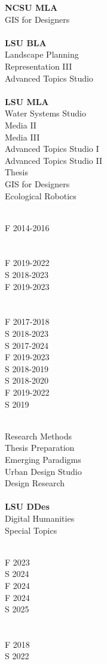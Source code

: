 \documentclass[10pt]{designcv}
\begin{document}
\begin{minipage}[t]{0.3\textwidth} 
\textbf{NCSU MLA}\\
GIS for Designers\\
\ \\
\textbf{LSU BLA}\\
Landscape Planning\\
Representation III\\
Advanced Topics Studio\\
\ \\
\textbf{LSU MLA}\\
Water Systems Studio\\
Media II\\
Media III\\
Advanced Topics Studio I\\
Advanced Topics Studio II\\
Thesis\\
GIS for Designers\\
Ecological Robotics\\
\end{minipage}
\begin{minipage}[t]{0.2\textwidth} 
\ \\
F 2014-2016\\
\ \\
\ \\
F 2019-2022\\
S 2018-2023\\
F 2019-2023\\
\ \\
\ \\
F 2017-2018\\
S 2018-2023\\
S 2017-2024\\
F 2019-2023\\
S 2018-2019\\
S 2018-2020\\
F 2019-2022\\
S 2019\\
\end{minipage}
\begin{minipage}[t]{0.3\textwidth}
\ \\
Research Methods\\
Thesis Preparation\\
Emerging Paradigms\\
Urban Design Studio\\
Design Research\\
\ \\
\textbf{LSU DDes}\\
Digital Humanities\\
Special Topics\\
\end{minipage}
\hfill
\begin{minipage}[t]{0.2\textwidth}
\ \\
F 2023\\
S 2024\\
F 2024\\
F 2024\\
S 2025\\
\ \\
\ \\
F 2018\\
S 2022\\
\end{minipage}
\hfill
\end{document}
